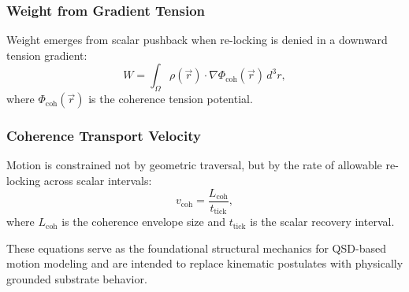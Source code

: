 \documentclass[entropy,article,submit,pdftex,moreauthors]{Definitions/mdpi}
\begin{document}
\subsubsection{Weight from Gradient Tension}
Weight emerges from scalar pushback when re-locking is denied in a downward tension gradient:
\begin{equation}
    W = \int_{\Omega} \rho(\vec{r}) \cdot \nabla \Phi_{\text{coh}}(\vec{r}) \, d^3r,
\end{equation}
where \( \Phi_{\text{coh}}(\vec{r}) \) is the coherence tension potential.

\subsubsection{Coherence Transport Velocity}
Motion is constrained not by geometric traversal, but by the rate of allowable re-locking across scalar intervals:
\begin{equation}
    v_{\text{coh}} = \frac{L_{\text{coh}}}{t_{\text{tick}}},
\end{equation}
where \( L_{\text{coh}} \) is the coherence envelope size and \( t_{\text{tick}} \) is the scalar recovery interval.

\vspace{1em}

These equations serve as the foundational structural mechanics for QSD-based motion modeling and are intended to replace kinematic postulates with physically grounded substrate behavior.




\end{document}

